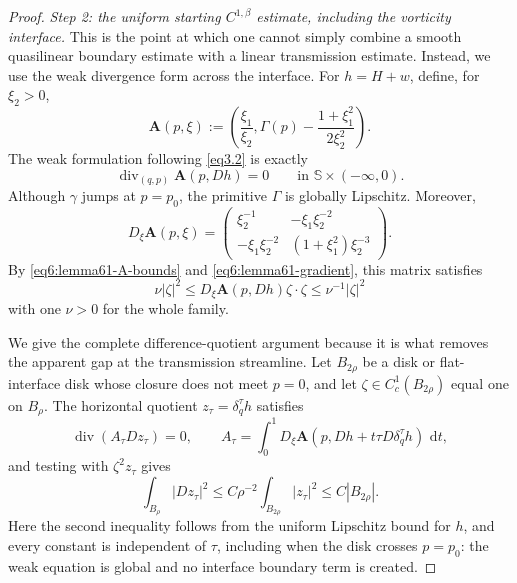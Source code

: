 \documentclass[11pt,reqno]{amsart}
\numberwithin{equation}{section}
\newcommand{\dd}{\,\mathrm{d}}
\theoremstyle{definition}
\theoremstyle{remark}
\begin{document}
\begin{proof}
\smallskip
\noindent\emph{Step 2: the uniform starting
$C^{1,\beta}$ estimate, including the vorticity interface.}
This is the point at which one cannot simply combine a smooth
quasilinear boundary estimate with a linear transmission estimate.
Instead, we use the weak divergence form across the interface.  For
$h=H+w$, define, for $\xi_2>0$,
\[
 \mathbf A(p,\xi)
 :=\left(\frac{\xi_1}{\xi_2},
 \Gamma(p)-\frac{1+\xi_1^2}{2\xi_2^2}\right).
\]
The weak formulation following \eqref{eq3.2} is exactly
\begin{equation}\label{eq6:lemma61-divergence}
 \operatorname{div}_{(q,p)}\mathbf A(p,Dh)=0
 \qquad\text{in }\mathbb S\times(-\infty,0).
\end{equation}
Although $\gamma$ jumps at $p=p_0$, the primitive $\Gamma$ is
globally Lipschitz.  Moreover,
\[
 D_\xi\mathbf A(p,\xi)=
 \begin{pmatrix}
  \xi_2^{-1}&-\xi_1\xi_2^{-2}\\
  -\xi_1\xi_2^{-2}&(1+\xi_1^2)\xi_2^{-3}
 \end{pmatrix}.
\]
By \eqref{eq6:lemma61-A-bounds} and
\eqref{eq6:lemma61-gradient}, this matrix satisfies
\begin{equation}\label{eq6:lemma61-div-ellipticity}
 \nu|\zeta|^2\le
 D_\xi\mathbf A(p,Dh)\zeta\cdot\zeta
 \le\nu^{-1}|\zeta|^2
\end{equation}
with one $\nu>0$ for the whole family.

We give the complete difference-quotient argument because it is what
removes the apparent gap at the transmission streamline.  Let
$B_{2\rho}$ be a disk or flat-interface disk whose closure does not
meet $p=0$, and let $\zeta\in C_c^1(B_{2\rho})$ equal one on
$B_\rho$.  The horizontal quotient $z_\tau=\delta_q^\tau h$ satisfies
\[
 \operatorname{div}(A_\tau Dz_\tau)=0,
 \qquad
 A_\tau=\int_0^1D_\xi\mathbf A
 (p,Dh+t\tau D\delta_q^\tau h)\,\dd t,
\]
and testing with $\zeta^2z_\tau$ gives
\begin{equation}\label{eq6:lemma61-horizontal-energy}
 \int_{B_\rho}|Dz_\tau|^2
 \le C\rho^{-2}\int_{B_{2\rho}}|z_\tau|^2
 \le C|B_{2\rho}|.
\end{equation}
Here the second inequality follows from the uniform Lipschitz bound
for $h$, and every constant is independent of $\tau$, including when
the disk crosses $p=p_0$: the weak equation is global and no
interface boundary term is created.


\end{proof}
\end{document}
